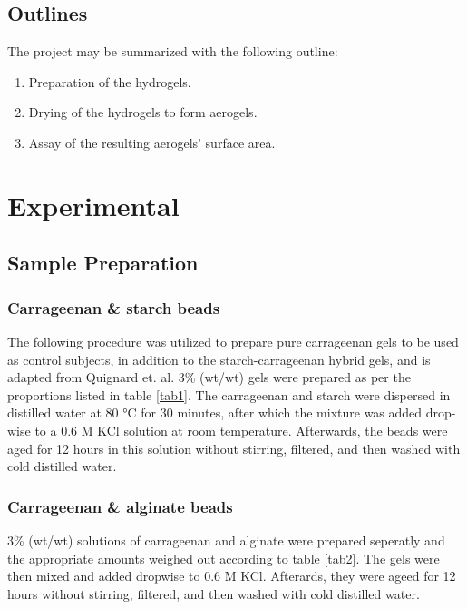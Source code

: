 \documentclass[a4paper,12pt]{article}
\begin{document}
\subsection{Outlines}

The project may be summarized with the following outline:

\begin{enumerate}
	\item Preparation of the hydrogels.
	\item Drying of the hydrogels to form aerogels.
	\item Assay of the resulting aerogels' surface area.
\end{enumerate}

\pagebreak

\section{Experimental}

\subsection{Sample Preparation}

\subsubsection{Carrageenan \& starch beads}

The following procedure was utilized to prepare pure carrageenan gels to be used as control subjects, in addition to the starch-carrageenan hybrid gels, and is adapted from Quignard et. al\supercite{quignard_aerogel_2008}. 3\% (wt/wt) gels were prepared as per the proportions listed in table \ref{tab1}. The carrageenan and starch were dispersed in distilled water at 80 °C for 30 minutes, after which the mixture was added drop-wise to a 0.6 M KCl solution at room temperature. Afterwards, the beads were aged for 12 hours in this solution without stirring, filtered, and then washed with cold distilled water.

\subsubsection{Carrageenan \& alginate beads}

3\% (wt/wt) solutions of carrageenan and alginate were prepared seperatly and the appropriate amounts weighed out according to table \ref{tab2}. The gels were then mixed and added dropwise to 0.6 M KCl. Afterards, they were ageed for 12 hours without stirring, filtered, and then washed with cold distilled water.
\end{document}
